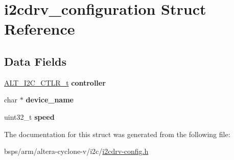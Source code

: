 \hypertarget{structi2cdrv__configuration}{}\section{i2cdrv\+\_\+configuration Struct Reference}
\label{structi2cdrv__configuration}
\subsection*{Data Fields}
\begin{DoxyCompactItemize}
\item 
\mbox{\label{structi2cdrv__configuration_a997260b07271e3485abeb8557e4f50fc}} 
\mbox{\hyperlink{group__ALT__I2C_ga1db51a8ca7c78d287a620a1f894ba1c5}{A\+L\+T\+\_\+\+I2\+C\+\_\+\+C\+T\+L\+R\+\_\+t}} {\bfseries controller}
\item 
\mbox{\label{structi2cdrv__configuration_a3055396832589ace6d39fa9fe6c1c75e}} 
char $\ast$ {\bfseries device\+\_\+name}
\item 
\mbox{\label{structi2cdrv__configuration_af9f5bc4a9f42175d75a0adc4683a3542}} 
uint32\+\_\+t {\bfseries speed}
\end{DoxyCompactItemize}


The documentation for this struct was generated from the following file\+:\begin{DoxyCompactItemize}
\item 
bsps/arm/altera-\/cyclone-\/v/i2c/\mbox{\hyperlink{i2cdrv-config_8h}{i2cdrv-\/config.\+h}}\end{DoxyCompactItemize}
